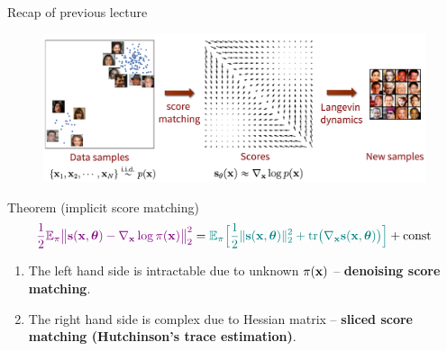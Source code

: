 \begin{frame}{Recap of previous lecture}
	\begin{figure}
		\centering
		\includegraphics[width=0.75\linewidth]{figs/smld}
	\end{figure}
	\vspace{-0.3cm} 
	\begin{block}{Theorem (implicit score matching)}
		\vspace{-0.6cm}
		\[
		{\color{violet}\frac{1}{2} \mathbb{E}_{\pi}\bigl\| \mathbf{s}(\mathbf{x}, \boldsymbol{\theta}) - \nabla_{\mathbf{x}} \log \pi(\mathbf{x}) \bigr\|^2_2} = {\color{teal}\mathbb{E}_{\pi}\Bigr[ \frac{1}{2}\| \mathbf{s}(\mathbf{x}, \boldsymbol{\theta}) \|_2^2 + \text{tr}\bigl(\nabla_{\mathbf{x}} \mathbf{s}(\mathbf{x}, \boldsymbol{\theta})\bigr) \Bigr]} + \text{const}
		\]
	\end{block}
	\vspace{-0.5cm}
	\begin{enumerate}
		\item {\color{violet}The left hand side} is intractable due to unknown $\pi(\mathbf{x})$ -- \textbf{denoising score matching}. 
		\item {\color{teal}The right hand side} is complex due to Hessian matrix -- \textbf{sliced score matching (Hutchinson's trace estimation)}.
	\end{enumerate}
\end{frame}
